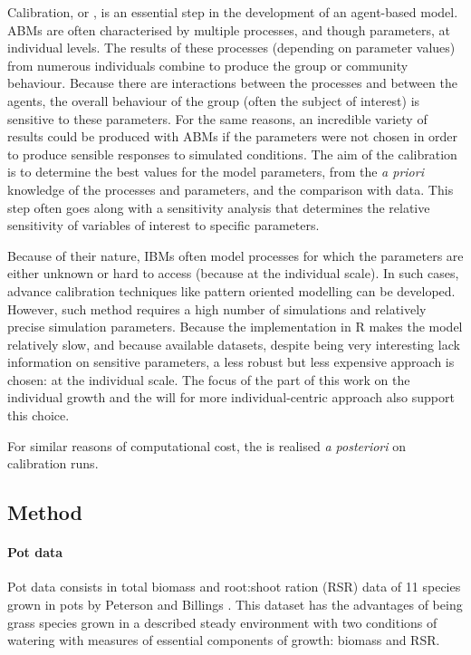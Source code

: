 Calibration, or , is an essential step in the development of an agent-based model. ABMs are often characterised by multiple processes, and though parameters, at individual levels. The results of these processes (depending on parameter values) from numerous individuals combine to produce the group or community behaviour. Because there are interactions between the processes and between the agents, the overall behaviour of the group (often the subject of interest) is sensitive to these parameters. For the same reasons, an incredible variety of results could be produced with ABMs if the parameters were not chosen in order to produce sensible responses to simulated conditions. The aim of the calibration is to determine the best values for the model parameters, from the \textit{a priori} knowledge of the processes and parameters, and the comparison with data. This step often goes along with a sensitivity analysis that determines the relative sensitivity of variables of interest to specific parameters.

Because of their nature, IBMs often model processes for which the parameters are either unknown or hard to access (because at the individual scale). In such cases, advance calibration techniques like pattern oriented modelling \parencite{grimm_pattern-oriented_2005, hartig_statistical_2011} can be developed. However, such method requires a high number of simulations and relatively precise simulation parameters. Because the implementation in R makes the model relatively slow, and because available datasets, despite being very interesting lack information on sensitive parameters, a less robust but less expensive approach is chosen:  at the individual scale. The focus of the part of this work on the individual growth and the will for more individual-centric approach also support this choice.

 For similar reasons of computational cost, the  is  realised \textit{a posteriori} on calibration runs.

\subsection{Method}

\paragraph{Pot data}
Pot data consists in total biomass and root:shoot ration (RSR) data of 11 species grown in pots by Peterson and Billings \parencite{peterson_growth_1982}. This dataset has the advantages of being grass species grown in a described steady environment with two conditions of watering with measures of essential components of growth: biomass and RSR.

